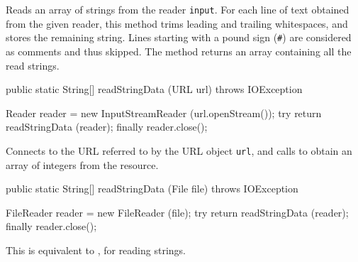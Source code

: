\begin{tabb}   Reads an array of strings from the
 reader \texttt{input}.
 For each line of text obtained from the
 given reader, this method
 trims leading and trailing whitespaces, and stores the remaining string.
 Lines starting with a pound sign (\texttt{\#})
 are considered as comments and thus skipped.
 The method returns an array containing
 all the read strings.
\end{tabb}
\begin{htmlonly}
\end{htmlonly}
\begin{code}

   public static String[] readStringData (URL url) throws IOException\begin{hide} {
      Reader reader = new InputStreamReader (url.openStream());
      try {
         return readStringData (reader);
      }
      finally {
         reader.close();
      }
   }\end{hide}
\end{code}
\begin{tabb}   Connects to the URL referred to by the URL object \texttt{url},
 and calls  to
 obtain an array of integers from
 the resource.
\end{tabb}
\begin{htmlonly}
\end{htmlonly}
\begin{code}

   public static String[] readStringData (File file) throws IOException\begin{hide} {
      FileReader reader = new FileReader (file);
      try {
         return readStringData (reader);
      }
      finally {
         reader.close();
      }
   }\end{hide}
\end{code}
\begin{tabb}   This is equivalent to ,
   for reading strings.
\end{tabb}
\begin{htmlonly}
\end{htmlonly}
